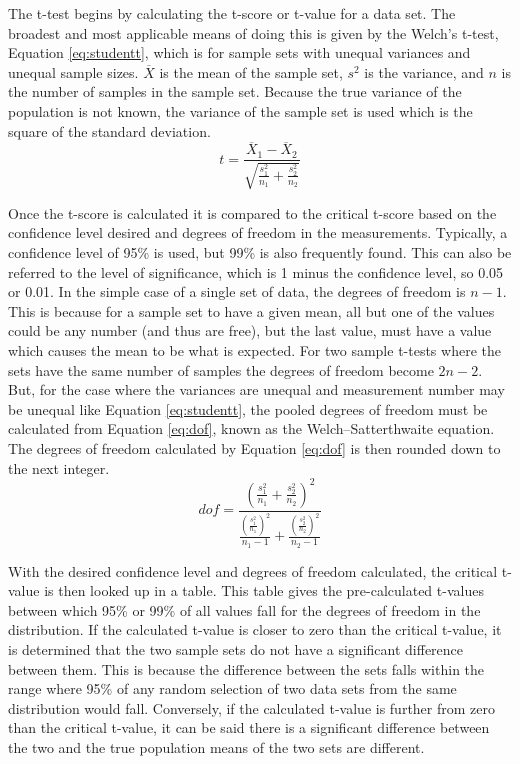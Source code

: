     The t-test begins by calculating the t-score or t-value for a data set.
    The broadest and most applicable means of doing this is given by the Welch's t-test, Equation \ref{eq:studentt}, which is for sample sets with unequal variances and unequal sample sizes.
    $\overline{X}$ is the mean of the sample set, $s^2$ is the variance, and $n$ is the number of samples in the sample set.
    Because the true variance of the population is not known, the variance of the sample set is used which is the square of the standard deviation.
    \begin{equation}
        \label{eq:studentt}
        t=\frac{\overline{X}_1 - \overline{X}_2}{\sqrt{\frac{s^2_1}{n_1}+\frac{s_2^2}{n_2}}}
    \end{equation}

    Once the t-score is calculated it is compared to the critical t-score based on the confidence level desired and degrees of freedom in the measurements.
    Typically, a confidence level of 95\% is used, but 99\% is also frequently found.
    This can also be referred to the level of significance, which is 1 minus the confidence level, so 0.05 or 0.01.
    In the simple case of a single set of data, the degrees of freedom is $n-1$.
    This is because for a sample set to have a given mean, all but one of the values could be any number (and thus are free), but the last value, must have a value which causes the mean to be what is expected.\cite{Tanner2013}
    For two sample t-tests where the sets have the same number of samples the degrees of freedom become $2n-2$.
    But, for the case where the variances are unequal and measurement number may be unequal like Equation \ref{eq:studentt}, the pooled degrees of freedom must be calculated from Equation \ref{eq:dof}, known as the Welch–Satterthwaite equation.
    The degrees of freedom calculated by Equation \ref{eq:dof} is then rounded down to the next integer.\cite{Anderson1987}
    \begin{equation}
        \label{eq:dof}
        dof=\frac{\left(\frac{s_1^2}{n_1}+\frac{s_2^2}{n_2}\right)^2}{\frac{\left(\frac{s_1^2}{n_1}\right)^2}{n_1-1}+\frac{\left(\frac{s_2^2}{n_2}\right)^2}{n_2-1}}
    \end{equation}

    With the desired confidence level and degrees of freedom calculated, the critical t-value is then looked up in a table.
    This table gives the pre-calculated t-values between which 95\% or 99\% of all values fall for the degrees of freedom in the distribution.
    If the calculated t-value is closer to zero than the critical t-value, it is determined that the two sample sets do not have a significant difference between them.
    This is because the difference between the sets falls within the range where 95\% of any random selection of two data sets from the same distribution would fall.
    Conversely, if the calculated t-value is further from zero than the critical t-value, it can be said there is a significant difference between the two and the true population means of the two sets are different.

